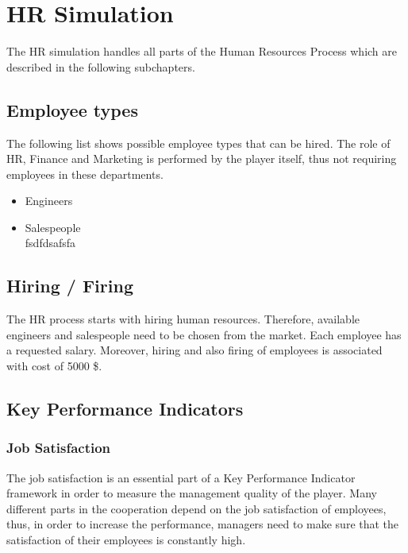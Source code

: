 \section{HR Simulation}
The HR simulation handles all parts of the Human Resources Process which are described in the following subchapters.
\subsection{Employee types}
The following list shows possible employee types that can be hired. The role of HR, Finance and Marketing is performed by the player itself, thus not requiring employees in these departments.
\begin{itemize}
    \item Engineers %
    \item Salespeople \\
    fsdfdsafsfa
\end{itemize}

\subsection{Hiring / Firing}
The HR process starts with hiring human resources. Therefore, available engineers and salespeople need to be chosen from the market. Each employee has a requested salary. Moreover, hiring and also firing of employees is associated with cost of 5000 \$. \cite{recruiterbox}

\subsection{Key Performance Indicators}
\subsubsection{Job Satisfaction}
The job satisfaction is an essential part of a Key Performance Indicator framework in order to measure the management quality of the player. Many different parts in the cooperation depend on the job satisfaction of employees, thus, in order to increase the performance, managers need to make sure that the satisfaction of their employees is constantly high.\cite{KOYS}

